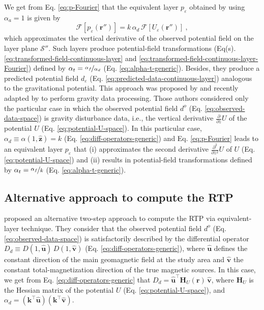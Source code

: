 We get from Eq. \ref{eq:p-Fourier} that the equivalent layer $p_{\varepsilon}$ obtained by using
$\alpha_{a} = 1$ is given by
\begin{equation}
	\mathcal{F} [ p_{\varepsilon}(\mathbf{r}'') ] =
	k \, \alpha_{d} \, \mathcal{F} \left[ U_{\varepsilon}(\mathbf{r}'') \right]  \: ,
	\label{eq:p-Fourier-generalized-eqs}
\end{equation}
which approximates the vertical derivative of the observed potential field on the layer plane $\mathcal{S}''$. 
Such layers produce potential-field transformations (Eq(s). \ref{eq:transformed-field-continuous-layer} and 
\ref{eq:transformed-field-continuous-layer-Fourier}) defined by $\alpha_{t} = \nicefrac{\alpha_{f}}{\alpha_{d}}$ 
(Eq. \ref{eq:alpha-t-generic}). Besides, they produce a predicted potential field $d_{\varepsilon}$ 
(Eq. \ref{eq:predicted-data-continuous-layer}) analogous to the gravitational potential.
This approach was proposed by \cite{cordell1992} and recently adapted by 
\cite{soler_uieda2021} to perform gravity data processing. 
Those authors considered only the particular case in which the observed potential field $d^{o}$ 
(Eq. \ref{eq:observed-data-space}) is gravity disturbance data, i.e., the vertical derivative 
$\tfrac{\partial}{\partial z} U$ of the potential $U$ (Eq. \ref{eq:potential-U-space}).
In this particular case, $\alpha_{d} \equiv \alpha(1, \hat{\mathbf{z}}) = k$ (Eq. \ref{eq:diff-operators-generic})
and Eq. \ref{eq:p-Fourier} leads to an equivalent layer $p_{\varepsilon}$ that
(i) approximates the second derivative $\tfrac{\partial^{2}}{\partial z^{2}} U$ of $U$ (Eq. \ref{eq:potential-U-space}) 
and
(ii) results in potential-field transformations defined by $\alpha_{t} = \nicefrac{\alpha_{f}}{k}$ (Eq. \ref{eq:alpha-t-generic}).

\subsection{Alternative approach to compute the RTP}

\cite{guspi_novara2009} proposed an alternative two-step approach to compute the RTP via equivalent-layer technique. 
They consider that the observed potential field $d^{o}$ (Eq. \ref{eq:observed-data-space}) is satisfactorily described 
by the differential operator $D_{d} \equiv D(1, \hat{\mathbf{u}}) \, D(1, \hat{\mathbf{v}})$
(Eq. \ref{eq:diff-operators-generic}), where $\hat{\mathbf{u}}$ defines the constant direction of the main geomagnetic
field at the study area and $\hat{\mathbf{v}}$ the constant total-magnetization direction of the true magnetic sources.
In this case, we get from Eq. \ref{eq:diff-operators-generic} that 
$D_{d} = \hat{\mathbf{u}}^{\top} \mathbf{H}_{U}(\mathbf{r}) \, \hat{\mathbf{v}}$,
where $\mathbf{H}_{U}$ is the Hessian matrix \citep[e.g.,][p. 158]{kaplan2002} of
the potential $U$ (Eq. \ref{eq:potential-U-space}), and 
$\alpha_{d} = \left(\mathbf{k}^{\top} \hat{\mathbf{u}} \right)\left(\mathbf{k}^{\top} \hat{\mathbf{v}} \right)$.

